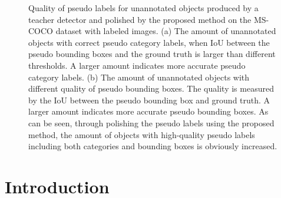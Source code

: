 \documentclass[letterpaper]{article} \usepackage{aaai23}  \usepackage{times}  \usepackage{helvet}  \usepackage{courier}  \usepackage[hyphens]{url}  \usepackage{graphicx} \urlstyle{rm} \def\UrlFont{\rm}  \usepackage{natbib}  \usepackage{caption} \frenchspacing  \setlength{\pdfpagewidth}{8.5in}  \setlength{\pdfpageheight}{11in}  \usepackage{algorithm}
\begin{document}
\begin{figure}[t!]
\centering
{}
\caption{Quality of pseudo labels for unannotated objects produced by a teacher detector and polished by the proposed method on the MS-COCO dataset with  labeled images. (a) The amount of unannotated objects with correct pseudo category labels, when IoU between the pseudo bounding boxes and the ground truth is larger than different thresholds. A larger amount indicates more accurate pseudo category labels. (b) The amount of unannotated objects with different quality of pseudo bounding boxes. The quality is measured by the IoU between the pseudo bounding box and ground truth. A larger amount indicates more accurate pseudo bounding boxes. As can be seen, 
through polishing the pseudo labels using the proposed method, the amount of objects with high-quality pseudo labels including both categories and bounding boxes is obviously increased.
}
\label{fig:coco_reg_polish}
\end{figure}

\section{Introduction}
\end{document}
